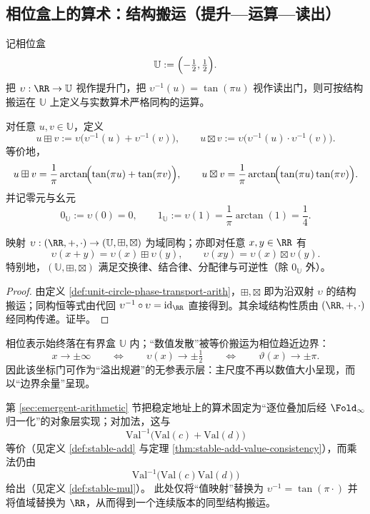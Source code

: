 \subsection{相位盒上的算术：结构搬运（提升—运算—读出）}\label{subsec:unit-circle-phase-arithmetic}
记相位盒
\[
\mathbb{U}:=\Bigl(-\tfrac12,\tfrac12\Bigr).
\]
把 \(\upsilon:\RR\to\mathbb{U}\) 视作提升门，把 \(\upsilon^{-1}(u)=\tan(\pi u)\) 视作读出门，则可按结构搬运在 \(\mathbb{U}\) 上定义与实数算术严格同构的运算。

\begin{definition}\label{def:unit-circle-phase-transport-arith}
对任意 \(u,v\in\mathbb{U}\)，定义
\[
u\boxplus v
:=\upsilon\!\bigl(\upsilon^{-1}(u)+\upsilon^{-1}(v)\bigr),
\qquad
u\boxtimes v
:=\upsilon\!\bigl(\upsilon^{-1}(u)\cdot\upsilon^{-1}(v)\bigr).
\]
等价地，
\[
u\boxplus v=\frac{1}{\pi}\arctan\!\Bigl(\tan(\pi u)+\tan(\pi v)\Bigr),
\qquad
u\boxtimes v=\frac{1}{\pi}\arctan\!\Bigl(\tan(\pi u)\tan(\pi v)\Bigr).
\]
并记零元与幺元
\[
0_{\mathbb{U}}:=\upsilon(0)=0,
\qquad
1_{\mathbb{U}}:=\upsilon(1)=\frac{1}{\pi}\arctan(1)=\frac14.
\]
\end{definition}

\begin{theorem}[与实数域严格同构]\label{thm:unit-circle-phase-field-iso}
映射
\(
\upsilon:(\RR,+,\cdot)\to(\mathbb{U},\boxplus,\boxtimes)
\)
为域同构；亦即对任意 \(x,y\in\RR\) 有
\[
\upsilon(x+y)=\upsilon(x)\boxplus\upsilon(y),
\qquad
\upsilon(xy)=\upsilon(x)\boxtimes\upsilon(y).
\]
特别地，\((\mathbb{U},\boxplus,\boxtimes)\) 满足交换律、结合律、分配律与可逆性（除 \(0_{\mathbb{U}}\) 外）。
\end{theorem}
\begin{proof}
由定义 \ref{def:unit-circle-phase-transport-arith}，\(\boxplus,\boxtimes\) 即为沿双射 \(\upsilon\) 的结构搬运；同构恒等式由代回 \(\upsilon^{-1}\circ \upsilon=\mathrm{id}_\RR\) 直接得到。其余域结构性质由 \((\RR,+,\cdot)\) 经同构传递。证毕。
\end{proof}

\begin{remark}[有界表示与边界承载发散]\label{rem:unit-circle-phase-bounded}
相位表示始终落在有界盒 \(\mathbb{U}\) 内；“数值发散”被等价搬运为相位趋近边界：
\[
x\to\pm\infty\qquad\Longleftrightarrow\qquad \upsilon(x)\to\pm\tfrac12
\qquad\Longleftrightarrow\qquad \vartheta(x)\to\pm\pi.
\]
因此该坐标门可作为“溢出规避”的无参表示层：主尺度不再以数值大小呈现，而以“边界余量”呈现。
\end{remark}

\begin{remark}\label{rem:unit-circle-phase-transport-analogy}
第 \ref{sec:emergent-arithmetic} 节把稳定地址上的算术固定为“逐位叠加后经 \(\Fold_\infty\) 归一化”的对象层实现；对加法，这与
\[
\mathrm{Val}^{-1}\!\bigl(\mathrm{Val}(c)+\mathrm{Val}(d)\bigr)
\]
等价（见定义 \ref{def:stable-add} 与定理 \ref{thm:stable-add-value-consistency}），而乘法仍由
\[
\mathrm{Val}^{-1}\!\bigl(\mathrm{Val}(c)\mathrm{Val}(d)\bigr)
\]
给出（见定义 \ref{def:stable-mul}）。
此处仅将“值映射”替换为 \(\upsilon^{-1}=\tan(\pi\cdot)\) 并将值域替换为 \(\RR\)，从而得到一个连续版本的同型结构搬运。
\end{remark}
